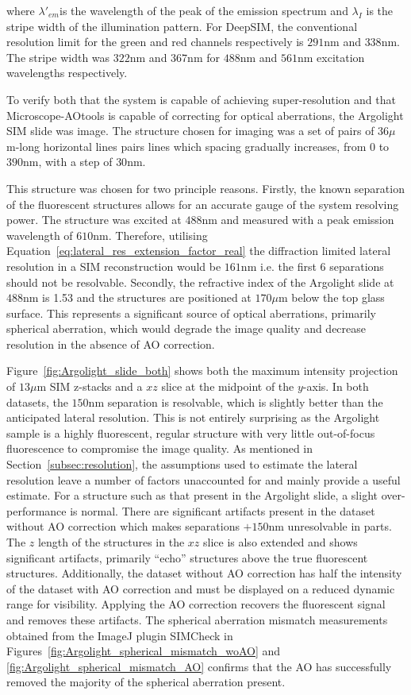 where $\lambda'_{em}$is the wavelength of the peak of the emission 
spectrum and $\lambda_{I}$ is the stripe width of the illumination
pattern. For DeepSIM, the conventional resolution limit for the 
green and red channels respectively is $291$nm and $338$nm. The stripe 
width was $322$nm and $367$nm for $488$nm and $561$nm excitation
wavelengths respectively.

To verify both that the system is capable of achieving super-resolution
and that Microscope-AOtools is capable of correcting for optical 
aberrations, the Argolight SIM slide was image. The structure chosen for
imaging was a set of pairs of $36 \mu$m-long horizontal lines pairs lines 
which spacing gradually increases, from $0$ to $390$nm, with a step of 
$30$nm. 

This structure was chosen for two principle reasons. Firstly, the known
separation of the fluorescent structures allows for an accurate gauge of 
the system resolving power. The structure was excited at $488$nm and 
measured with a peak emission wavelength of $610$nm. Therefore, utilising 
Equation~\ref{eq:lateral_res_extension_factor_real} the diffraction 
limited lateral resolution in a SIM reconstruction would be $161$nm i.e. 
the first 6 separations should not be resolvable. Secondly, the refractive 
index of the Argolight slide at $488$nm is 1.53 and the structures are 
positioned at $170\mu$m below the top glass surface\cite{argolight2017user}.
This represents a significant source of optical aberrations, primarily
spherical aberration, which would degrade the image quality and decrease
resolution in the absence of AO correction.

Figure~\ref{fig:Argolight_slide_both} shows both the maximum intensity 
projection of $13\mu$m SIM z-stacks and a $xz$ slice at the midpoint of 
the $y$-axis. In both datasets, the $150$nm separation is resolvable, which 
is slightly better than the anticipated lateral resolution. This is not 
entirely surprising as the Argolight sample is a highly fluorescent, 
regular structure with very little out-of-focus fluorescence to compromise 
the image quality. As mentioned in Section~\ref{subsec:resolution}, the 
assumptions used to estimate the lateral resolution leave a number of 
factors unaccounted for and mainly provide a useful 
estimate\cite{den1997resolution}. For a structure such as that present 
in the Argolight slide, a slight over-performance is normal. There are 
significant artifacts present in the dataset without AO correction which 
makes separations $+150$nm unresolvable in parts. The $z$ length of the 
structures in the $xz$ slice is also extended and shows significant 
artifacts, primarily ``echo'' structures above the true fluorescent 
structures. Additionally, the dataset without AO correction has half the 
intensity of the dataset with AO correction and must be displayed on a 
reduced dynamic range for visibility. Applying the AO correction recovers 
the fluorescent signal and removes these artifacts. The spherical 
aberration mismatch measurements obtained from the ImageJ plugin SIMCheck 
in Figures~\ref{fig:Argolight_spherical_mismatch_woAO} and 
\ref{fig:Argolight_spherical_mismatch_AO} confirms that the AO has 
successfully removed the majority of the spherical aberration 
present\cite{ball2015simcheck}.

